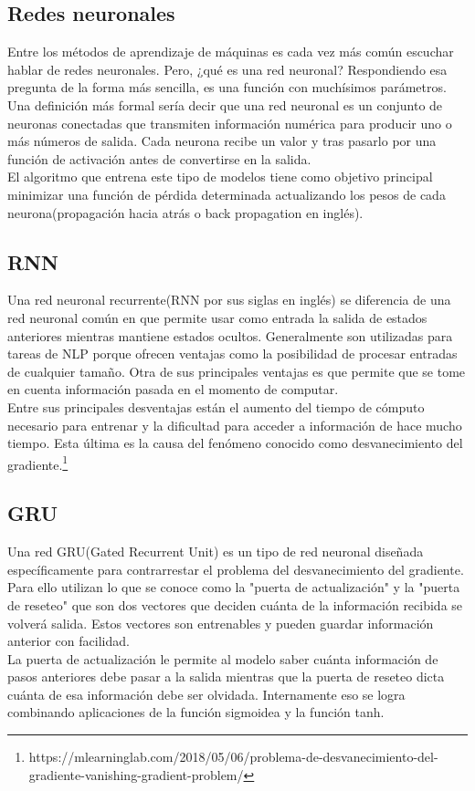 \subsection{Redes neuronales}
Entre los métodos de aprendizaje de máquinas es cada vez más común escuchar hablar de redes neuronales. Pero, ¿qué es una red neuronal? Respondiendo esa pregunta de la forma más sencilla, es una función con muchísimos parámetros.\\
Una definición más formal sería decir que una red neuronal es un conjunto de neuronas conectadas que transmiten información numérica para producir uno o más números de salida. Cada neurona recibe un valor y tras pasarlo por una función de activación antes de convertirse en la salida. \\
El algoritmo que entrena este tipo de modelos tiene como objetivo principal minimizar una función de pérdida determinada actualizando los pesos de cada neurona(propagación hacia atrás o back propagation en inglés).
\subsection{RNN}
Una red neuronal recurrente(RNN por sus siglas en inglés) se diferencia de una red neuronal común en que permite usar como entrada la salida de estados anteriores mientras mantiene estados ocultos. Generalmente son utilizadas para tareas de NLP porque ofrecen ventajas como la posibilidad de procesar entradas de cualquier tamaño. Otra de sus principales ventajas es que permite que se tome en cuenta información pasada en el momento de computar.\\
Entre sus principales desventajas están el aumento del tiempo de cómputo necesario para entrenar y la dificultad para acceder a información de hace mucho tiempo. Esta última es la causa del fenómeno conocido como desvanecimiento del gradiente.\footnote{https://mlearninglab.com/2018/05/06/problema-de-desvanecimiento-del-gradiente-vanishing-gradient-problem/}
\subsection{GRU}
Una red GRU(Gated Recurrent Unit) es un tipo de red neuronal diseñada específicamente para contrarrestar el problema del desvanecimiento del gradiente. Para ello utilizan lo que se conoce como la "puerta de actualización" y la "puerta de reseteo" que son dos vectores que deciden cuánta de la información recibida se volverá salida. Estos vectores son entrenables y pueden guardar información anterior con facilidad.\\
La puerta de actualización le permite al modelo saber cuánta información de pasos anteriores debe pasar a la salida mientras que la puerta de reseteo dicta cuánta de esa información debe ser olvidada. Internamente eso se logra combinando aplicaciones de la función sigmoidea y la función tanh. 
